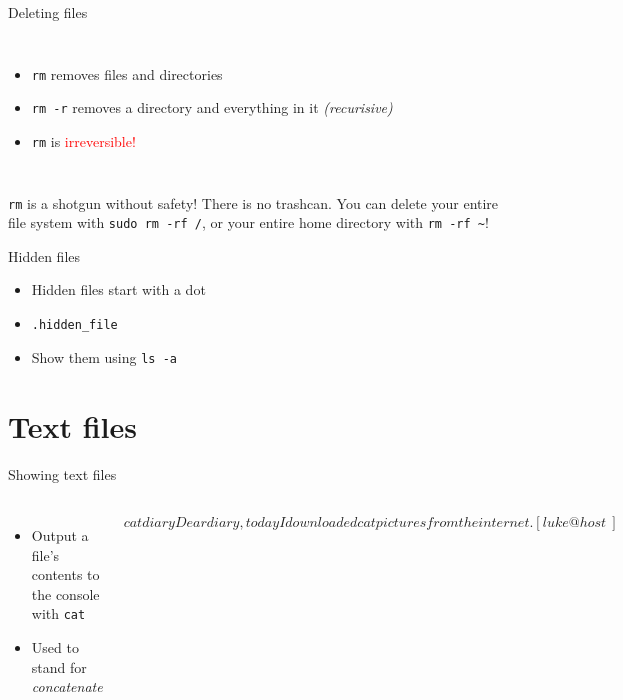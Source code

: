     \begin{frame}[t,fragile]{Deleting files}
        \begin{columns}[T]
            \begin{itemize}
                \item \texttt{rm} removes files and directories
                \item \texttt{rm -r} removes a directory and everything in it
                    \emph{(recurisive)}
                \item \texttt{rm} is \textcolor{red}{irreversible!}
            \end{itemize}
        \end{columns}
        \vspace{0.7cm}
        \begin{WarningBox}
            \texttt{rm} is a shotgun without safety! There is no trashcan.
            You can delete your entire file system with \texttt{sudo rm -rf /},
            or your entire home directory with \texttt{rm -rf \textasciitilde}\:!%
        \end{WarningBox}
    \end{frame}

    \begin{frame}[t,fragile]{Hidden files}
        \begin{itemize}
            \item{Hidden files start with a dot}
            \item{\texttt{.hidden\_file}}
            \item{Show them using \texttt{ls -a}}
        \end{itemize}
    \end{frame}

    \section{Text files}

    \begin{frame}[t,fragile]{Showing text files}
        \begin{columns}[T]
            \begin{itemize}
                \item Output a file's contents to the console with
                    \texttt{cat}
                \item Used to stand for \emph{concatenate}
            \end{itemize}
            \begin{bashenv}$ cat diary
Dear diary, today I downloaded
cat pictures from the internet.
[luke@host ~]$
            \end{bashenv}
        \end{columns}
    \end{frame}

